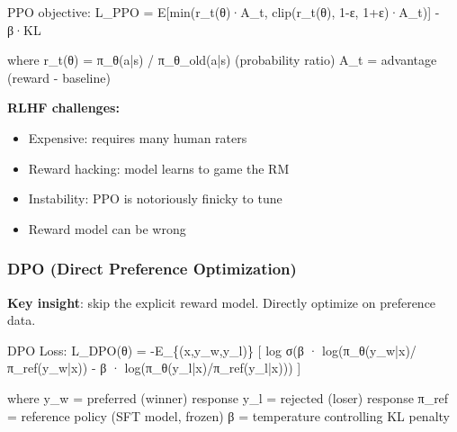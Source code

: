 \documentclass[11pt]{article}
\providecommand{\tightlist}{\setlength{\itemsep}{1pt}\setlength{\parskip}{0pt}}
\newenvironment{Shaded}{\begin{snugshade}}{\end{snugshade}}
\newcommand{\BuiltInTok}[1]{\textcolor[rgb]{0.50,0.55,0.55}{#1}}
\newcommand{\DecValTok}[1]{\textcolor[rgb]{0.96,0.45,0.00}{#1}}
\newcommand{\NormalTok}[1]{\textcolor[rgb]{0.81,0.81,0.76}{#1}}
\newcommand{\OperatorTok}[1]{\textcolor[rgb]{0.81,0.81,0.76}{#1}}
\begin{document}
\begin{Shaded}
\begin{Highlighting}[]
\NormalTok{PPO objective:}
\NormalTok{L\_PPO }\OperatorTok{=}\NormalTok{ E[}\BuiltInTok{min}\NormalTok{(r\_t(θ)·A\_t, clip(r\_t(θ), }\DecValTok{1}\OperatorTok{{-}}\NormalTok{ε, }\DecValTok{1}\OperatorTok{+}\NormalTok{ε)·A\_t)] }\OperatorTok{{-}}\NormalTok{ β·KL}

\NormalTok{where r\_t(θ) }\OperatorTok{=}\NormalTok{ π\_θ(a}\OperatorTok{|}\NormalTok{s) }\OperatorTok{/}\NormalTok{ π\_θ\_old(a}\OperatorTok{|}\NormalTok{s)  (probability ratio)}
\NormalTok{      A\_t }\OperatorTok{=}\NormalTok{ advantage (reward }\OperatorTok{{-}}\NormalTok{ baseline)}
\end{Highlighting}
\end{Shaded}

\textbf{RLHF challenges:}

\begin{itemize}
\tightlist
\item
  Expensive: requires many human raters
\item
  Reward hacking: model learns to game the RM
\item
  Instability: PPO is notoriously finicky to tune
\item
  Reward model can be wrong
\end{itemize}

\subsubsection{DPO (Direct Preference Optimization)}\label{dpo-direct-preference-optimization}

\textbf{Key insight}: skip the explicit reward model. Directly optimize on preference data.


\begin{Shaded}
\begin{Highlighting}[]
\NormalTok{DPO Loss:}
\NormalTok{L\_DPO(θ) }\OperatorTok{=} \OperatorTok{{-}}\NormalTok{E\_\{(x,y\_w,y\_l)\} [}
\NormalTok{    log σ(β · log(π\_θ(y\_w}\OperatorTok{|}\NormalTok{x)}\OperatorTok{/}\NormalTok{π\_ref(y\_w}\OperatorTok{|}\NormalTok{x))}
           \OperatorTok{{-}}\NormalTok{ β · log(π\_θ(y\_l}\OperatorTok{|}\NormalTok{x)}\OperatorTok{/}\NormalTok{π\_ref(y\_l}\OperatorTok{|}\NormalTok{x)))}
\NormalTok{]}

\NormalTok{where y\_w }\OperatorTok{=}\NormalTok{ preferred (winner) response}
\NormalTok{      y\_l }\OperatorTok{=}\NormalTok{ rejected (loser) response}
\NormalTok{      π\_ref }\OperatorTok{=}\NormalTok{ reference policy (SFT model, frozen)}
\NormalTok{      β }\OperatorTok{=}\NormalTok{ temperature controlling KL penalty}
\end{Highlighting}
\end{Shaded}
\end{document}
